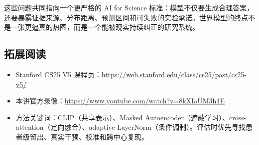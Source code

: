 这些问题共同指向一个更严格的 AI for Science 标准：模型不仅要生成合理答案，还要暴露证据来源、分布距离、预测区间和可失败的实验承诺。世界模型的终点不是一张更逼真的热图，而是一个能被现实持续纠正的研究系统。

\subsection{拓展阅读}

\begin{itemize}[itemsep=0.2em,topsep=0.2em]
  \item Stanford CS25 V5 课程页：\url{https://web.stanford.edu/class/cs25/past/cs25-v5/}
  \item 本讲官方录像：\url{https://www.youtube.com/watch?v=8kXIaUM3h1E}
  \item 方法关键词：CLIP（共享表示）、Masked Autoencoder（遮蔽学习）、cross-attention（定向融合）、adaptive LayerNorm（条件调制）。评估时优先寻找患者级留出、真实干预、校准和跨中心复现。
\end{itemize}


